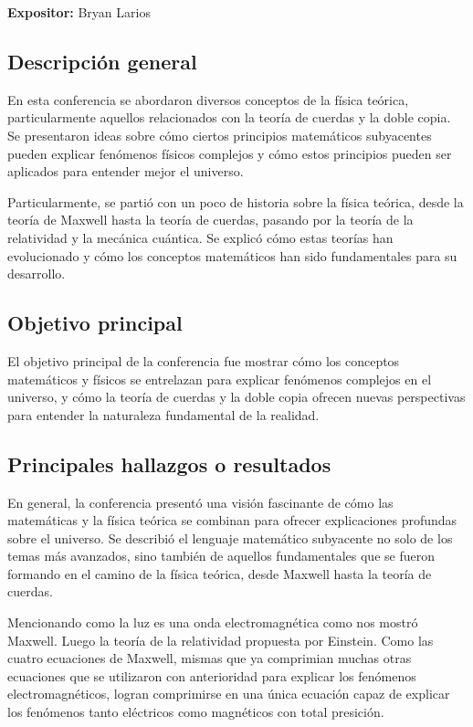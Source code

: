 \documentclass[11pt]{article}
\begin{document}
    \textbf{Expositor:} Bryan Larios

    \subsection{Descripción general}
    En esta conferencia se abordaron diversos conceptos de la física teórica, particularmente aquellos relacionados con la teoría de cuerdas y la doble copia. Se presentaron ideas sobre cómo ciertos principios matemáticos subyacentes pueden explicar fenómenos físicos complejos y cómo estos principios pueden ser aplicados para entender mejor el universo.

    Particularmente, se partió con un poco de historia sobre la física teórica, desde la teoría de Maxwell hasta la teoría de cuerdas, pasando por la teoría de la relatividad y la mecánica cuántica. Se explicó cómo estas teorías han evolucionado y cómo los conceptos matemáticos han sido fundamentales para su desarrollo.

    \subsection{Objetivo principal}
    El objetivo principal de la conferencia fue mostrar cómo los conceptos matemáticos y físicos se entrelazan para explicar fenómenos complejos en el universo, y cómo la teoría de cuerdas y la doble copia ofrecen nuevas perspectivas para entender la naturaleza fundamental de la realidad.

    \subsection{Principales hallazgos o resultados}
    En general, la conferencia presentó una visión fascinante de cómo las matemáticas y la física teórica se combinan para ofrecer explicaciones profundas sobre el universo. Se describió el lenguaje matemático subyacente no solo de los temas más avanzados, sino también de aquellos fundamentales que se fueron formando en el camino de la física teórica, desde Maxwell hasta la teoría de cuerdas. 

    Mencionando como la luz es una onda electromagnética como nos mostró Maxwell. Luego la teoría de la relatividad propuesta por Einstein. Como las cuatro ecuaciones de Maxwell, mismas que ya comprimian muchas otras ecuaciones que se utilizaron con anterioridad para explicar los fenómenos electromagnéticos, logran comprimirse en una única ecuación capaz de explicar los fenómenos tanto eléctricos como magnéticos con total presición.
\end{document}
